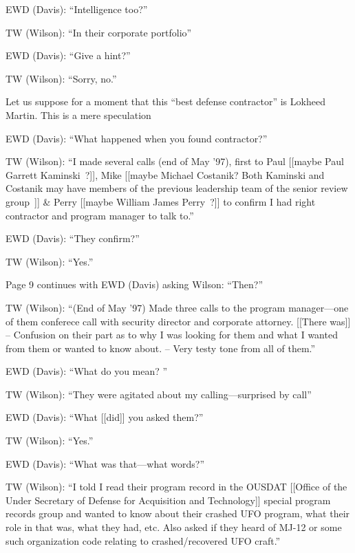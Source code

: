 \begin{svgraybox}
\noindent EWD (Davis): ``Intelligence too?''

\noindent TW (Wilson): ``In their corporate portfolio''

\noindent EWD (Davis): ``Give a hint?''

\noindent TW (Wilson): ``Sorry, no.''

Let us suppose for a moment that this ``best defense contractor'' is Lokheed Martin. This is a mere speculation~\cite{Dolan-MrX-Disclosure2020Jul}

\noindent EWD (Davis): ``What happened when you found contractor?''

\noindent TW (Wilson): ``I made several calls (end of May '97), first to Paul
[[maybe Paul Garrett Kaminski~\cite{cox20,Dolan-MrX-Disclosure2020Jul}?]], Mike [[maybe Michael Costanik?
Both Kaminski and Costanik may have members of the previous leadership team of the senior review group~\cite{Dolan-MrX-Disclosure2020Jul}]]
{\&} Perry [[maybe William James Perry~?]] to confirm I had right contractor and program manager to talk to.''

\noindent EWD (Davis): ``They confirm?''

\noindent TW (Wilson): ``Yes.''

Page 9 continues with EWD (Davis) asking Wilson: ``Then?''

\noindent TW (Wilson): ``(End of May '97) Made three calls to the program manager---one of them conferece call with security director and corporate attorney.
[[There was]] -- Confusion on their part as to why I was looking for them and what I wanted from them or wanted to know about.
-- Very testy tone from all of them.''

\noindent EWD (Davis): ``What do you mean? ''

\noindent TW (Wilson): ``They were agitated about my calling---surprised by call''

\noindent EWD (Davis): ``What [[did]] you asked them?''

\noindent TW (Wilson): ``Yes.''

\noindent EWD (Davis): ``What was that---what words?''

\noindent TW (Wilson): ``I told I read their program record in the OUSDAT [[Office of the Under Secretary of Defense for Acquisition and Technology]]
special program records group  and wanted to know about their crashed UFO program, what their role in that was, what
they had, etc. Also asked if they heard of MJ-12 or some such organization code relating to crashed/recovered UFO craft.''


\end{svgraybox}
